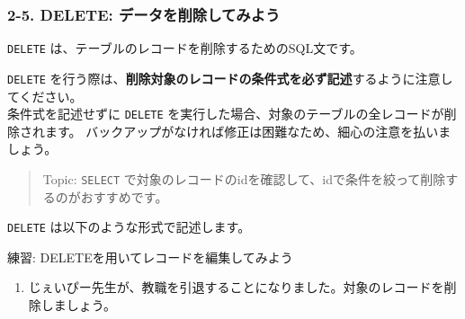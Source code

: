 \begin{Shaded}
\begin{Highlighting}[]
 \OperatorTok{*} 
\end{Highlighting}
\end{Shaded}

\subsubsection{2-5. DELETE:
データを削除してみよう}\label{delete-ux30c7ux30fcux30bfux3092ux524aux9664ux3057ux3066ux307fux3088ux3046}

\texttt{DELETE} は、テーブルのレコードを削除するためのSQL文です。

\texttt{DELETE}
を行う際は、\textbf{削除対象のレコードの条件式を必ず記述}するように注意してください。\\
条件式を記述せずに \texttt{DELETE}
を実行した場合、対象のテーブルの全レコードが削除されます。
バックアップがなければ修正は困難なため、細心の注意を払いましょう。

\begin{quote}
Topic: \texttt{SELECT}
で対象のレコードのidを確認して、idで条件を絞って削除するのがおすすめです。
\end{quote}

\texttt{DELETE} は以下のような形式で記述します。

\begin{Shaded}
\begin{Highlighting}[]
 
\end{Highlighting}
\end{Shaded}

練習: DELETEを用いてレコードを編集してみよう

\begin{enumerate}
\def\labelenumi{\arabic{enumi}.}
\tightlist
\item
  じぇいぴー先生が、教職を引退することになりました。対象のレコードを削除しましょう。
\end{enumerate}

\begin{Shaded}
\begin{Highlighting}[]
 \OperatorTok{*} \OperatorTok{=} \NormalTok{;}

   \OperatorTok{=}
\end{Highlighting}
\end{Shaded}

